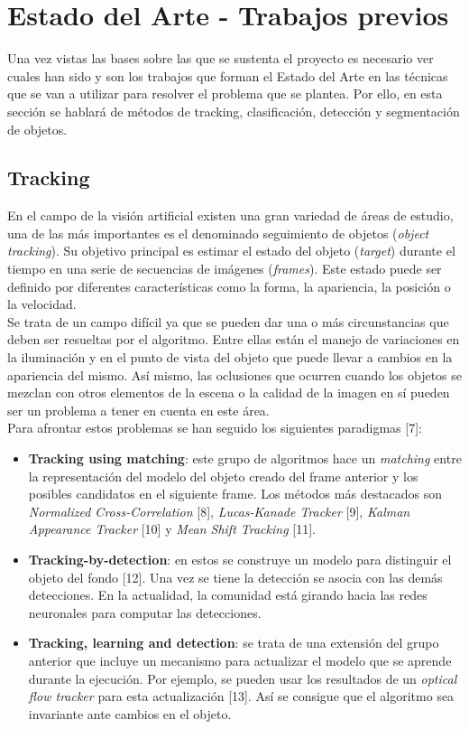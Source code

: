 \documentclass{bmvc2k}
\begin{document}
\section{Estado del Arte - Trabajos previos}
Una vez vistas las bases sobre las que se sustenta el proyecto es necesario ver cuales han sido y son los trabajos que forman el Estado del Arte en las técnicas que se van a utilizar para resolver el problema que se plantea. Por ello, en esta sección se hablará de métodos de tracking, clasificación, detección y segmentación de objetos.
\subsection{Tracking}
En el campo de la visión artificial existen una gran variedad de áreas de estudio, una de las más importantes es el denominado seguimiento de objetos (\textit{object tracking}). Su objetivo principal es estimar el estado del objeto (\textit{target}) durante el tiempo en una serie de secuencias de imágenes (\textit{frames}). Este estado puede ser definido por diferentes características como la forma, la apariencia, la posición o la velocidad.\\
Se trata de un campo difícil ya que se pueden dar una o más circunstancias que deben ser resueltas por el algoritmo. Entre ellas están el manejo de variaciones en la iluminación y en el punto de vista del objeto que puede llevar a cambios en la apariencia del mismo. Así mismo, las oclusiones que ocurren cuando los objetos se mezclan con otros elementos de la escena o la calidad de la imagen en sí pueden ser un problema a tener en cuenta en este área.\\
Para afrontar estos problemas se han seguido los siguientes paradigmas [7]:
\begin{itemize}
\item \textbf{Tracking using matching}: este grupo de algoritmos hace un \textit{matching} entre la representación del modelo del objeto creado del frame anterior y los posibles candidatos en el siguiente frame. Los métodos más destacados son \textit{Normalized Cross-Correlation} [8], \textit{Lucas-Kanade Tracker} [9], \textit{Kalman Appearance Tracker} [10] y \textit{Mean Shift Tracking} [11].
\item \textbf{Tracking-by-detection}: en estos se construye un modelo para distinguir el objeto del fondo [12]. Una vez se tiene la detección se asocia con las demás detecciones. En la actualidad, la comunidad está girando hacia las redes neuronales para computar las detecciones.
\item \textbf{Tracking, learning and detection}: se trata de una extensión del grupo anterior que incluye un mecanismo para actualizar el modelo que se aprende durante la ejecución. Por ejemplo, se pueden usar los resultados de un \textit{optical flow tracker} para esta actualización [13]. Así se consigue que el algoritmo sea invariante ante cambios en el objeto. 
\end{itemize}
\end{document}
